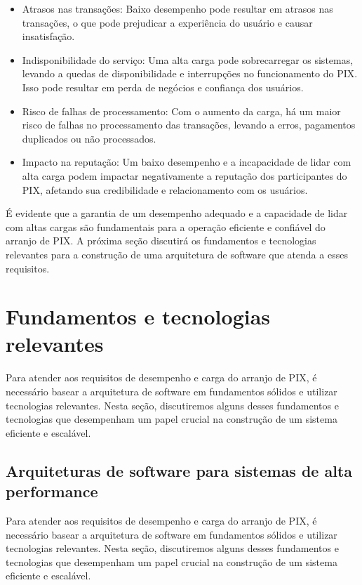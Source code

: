\documentclass[12pt]{article}
\begin{document}
\begin{itemize}

  \item Atrasos nas transações: Baixo desempenho pode resultar em atrasos nas transações, o que pode prejudicar a experiência do usuário e causar insatisfação.

  \item Indisponibilidade do serviço: Uma alta carga pode sobrecarregar os sistemas, levando a quedas de disponibilidade e interrupções no funcionamento do PIX. Isso pode resultar em perda de negócios e confiança dos usuários.

  \item Risco de falhas de processamento: Com o aumento da carga, há um maior risco de falhas no processamento das transações, levando a erros, pagamentos duplicados ou não processados.

  \item Impacto na reputação: Um baixo desempenho e a incapacidade de lidar com alta carga podem impactar negativamente a reputação dos participantes do PIX, afetando sua credibilidade e relacionamento com os usuários.

\end{itemize}
É evidente que a garantia de um desempenho adequado e a capacidade de lidar com altas cargas são fundamentais para a operação eficiente e confiável do arranjo de PIX. A próxima seção discutirá os fundamentos e tecnologias relevantes para a construção de uma arquitetura de software que atenda a esses requisitos.

\section{Fundamentos e tecnologias relevantes} \label{sec:tecnologia}

Para atender aos requisitos de desempenho e carga do arranjo de PIX, é necessário basear a arquitetura de software em fundamentos sólidos e utilizar tecnologias relevantes. Nesta seção, discutiremos alguns desses fundamentos e tecnologias que desempenham um papel crucial na construção de um sistema eficiente e escalável.

\subsection{Arquiteturas de software para sistemas de alta performance} \label{sec:tecnologia}

Para atender aos requisitos de desempenho e carga do arranjo de PIX, é necessário basear a arquitetura de software em fundamentos sólidos e utilizar tecnologias relevantes. Nesta seção, discutiremos alguns desses fundamentos e tecnologias que desempenham um papel crucial na construção de um sistema eficiente e escalável.
\end{document}
